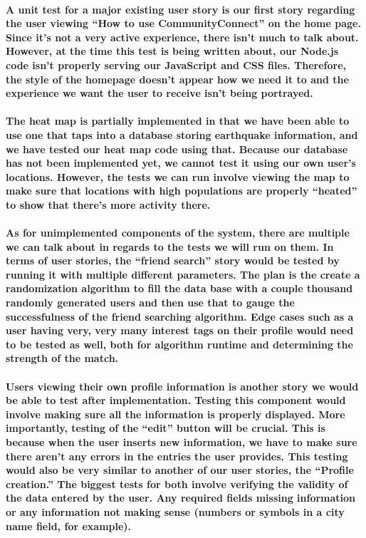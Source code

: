 \documentclass[12pt]{article}
\begin{document}
\begin{enumerate}
\begin{enumerate}
\begin{enumerate}
\begin{enumerate}
\paragraph{\normalfont \indent A unit test for a major existing user story is our first story regarding the user viewing “How to use CommunityConnect” on the home page. Since it’s not a very active experience, there isn’t much to talk about. However, at the time this test is being written about, our Node.js code isn’t properly serving our JavaScript and CSS files. Therefore, the style of the homepage doesn’t appear how we need it to and the experience we want the user to receive isn’t being portrayed.
}
\paragraph{\normalfont \indent  The heat map is partially implemented in that we have been able to use one that taps into a database storing earthquake information, and we have tested our heat map code using that. Because our database has not been implemented yet, we cannot test it using our own user’s locations. However, the tests we can run involve viewing the map to make sure that locations with high populations are properly “heated” to show that there’s more activity there.
}
\paragraph{\normalfont \indent  As for unimplemented components of the system, there are multiple we can talk about in regards to the tests we will run on them. In terms of user stories, the “friend search” story would be tested by running it with multiple different parameters. The plan is the create a randomization algorithm to fill the data base with a couple thousand randomly generated users and then use that to gauge the successfulness of the friend searching algorithm. Edge cases such as a user having very, very many interest tags on their profile would need to be tested as well, both for algorithm runtime and determining the strength of the match.
}
\paragraph{\normalfont \indent Users viewing their own profile information is another story we would be able to test after implementation. Testing this component would involve making sure all the information is properly displayed. More importantly, testing of the “edit” button will be crucial. This is because when the user inserts new information, we have to make sure there aren’t any errors in the entries the user provides. This testing would also be very similar to another of our user stories, the “Profile creation.” The biggest tests for both involve verifying the validity of the data entered by the user. Any required fields missing information or any information not making sense (numbers or symbols in a city name field, for example).
}



\end{enumerate}
\end{enumerate}
\end{enumerate}
\end{enumerate}
\end{document}
